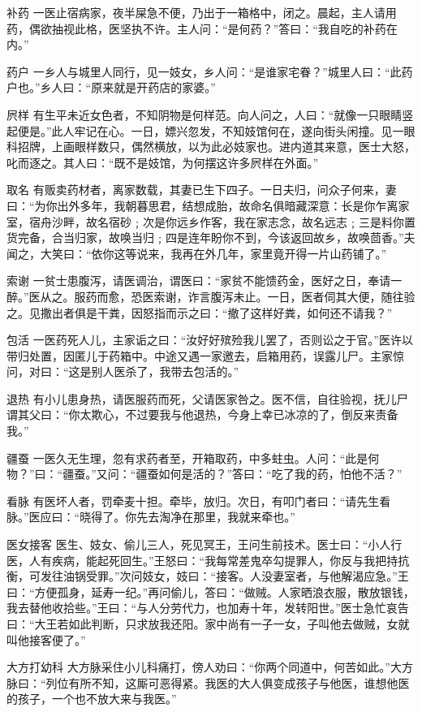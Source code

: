 \documentclass[12pt,UTF8]{ctexbook}
\begin{document}
补药
一医止宿病家，夜半屎急不便，乃出于一箱格中，闭之。晨起，主人请用药，偶欲抽视此格，医坚执不许。主人问：“是何药？”答曰：“我自吃的补药在内。”

药户
一乡人与城里人同行，见一妓女，乡人问：“是谁家宅眷？”城里人曰：“此药户也。”乡人曰：“原来就是开药店的家婆。”

屄样
有生平未近女色者，不知阴物是何样范。向人问之，人曰：“就像一只眼睛竖起便是。”此人牢记在心。一日，嫖兴忽发，不知妓馆何在，遂向街头闲撞。见一眼科招牌，上画眼样数只，偶然横放，以为此必妓家也。进内道其来意，医士大怒，叱而逐之。其人曰：“既不是妓馆，为何摆这许多屄样在外面。”

取名
有贩卖药材者，离家数载，其妻已生下四子。一日夫归，问众子何来，妻曰：“为你出外多年，我朝暮思君，结想成胎，故命名俱暗藏深意：长是你乍离家室，宿舟沙畔，故名宿砂﹔次是你远乡作客，我在家志念，故名远志﹔三是料你置货完备，合当归家，故唤当归﹔四是连年盼你不到，今该返回故乡，故唤茴香。”夫闻之，大笑曰：“依你这等说来，我再在外几年，家里竟开得一片山药铺了。”

索谢
一贫士患腹泻，请医调治，谓医曰：“家贫不能馈药金，医好之日，奉请一醉。”医从之。服药而愈，恐医索谢，诈言腹泻未止。一日，医者伺其大便，随往验之。见撒出者俱是干粪，因怒指而示之曰：“撤了这样好粪，如何还不请我？”

包活
一医药死人儿，主家诟之曰：“汝好好殡殓我儿罢了，否则讼之于官。”医许以带归处置，因匿儿于药箱中。中途又遇一家邀去，启箱用药，误露儿尸。主家惊问，对曰：“这是别人医杀了，我带去包活的。”

退热
有小儿患身热，请医服药而死，父请医家咎之。医不信，自往验视，抚儿尸谓其父曰：“你太欺心，不过要我与他退热，今身上幸已冰凉的了，倒反来责备我。”

疆蚕
一医久无生理，忽有求药者至，开箱取药，中多蛀虫。人问：“此是何物？”曰：“疆蚕。”又问：“疆蚕如何是活的？”答曰：“吃了我的药，怕他不活？”

看脉
有医坏人者，罚牵麦十担。牵毕，放归。次日，有叩门者曰：“请先生看脉。”医应曰：“晓得了。你先去淘净在那里，我就来牵也。”

医女接客
医生、妓女、偷儿三人，死见冥王，王问生前技术。医士曰：“小人行医，人有疾病，能起死回生。”王怒曰：“我每常差鬼卒勾提罪人，你反与我把持抗衡，可发往油锅受罪。”次问妓女，妓曰：“接客。人没妻室者，与他解渴应急。”王曰：“方便孤身，延寿一纪。”再问偷儿，答曰：“做贼。人家晒浪衣服，散放银钱，我去替他收拾些。”王曰：“与人分劳代力，也加寿十年，发转阳世。”医士急忙哀告曰：“大王若如此判断，只求放我还阳。家中尚有一子一女，子叫他去做贼，女就叫他接客便了。”

大方打幼科
大方脉采住小儿科痛打，傍人劝曰：“你两个同道中，何苦如此。”大方脉曰：“列位有所不知，这厮可恶得紧。我医的大人俱变成孩子与他医，谁想他医的孩子，一个也不放大来与我医。”
\end{document}
